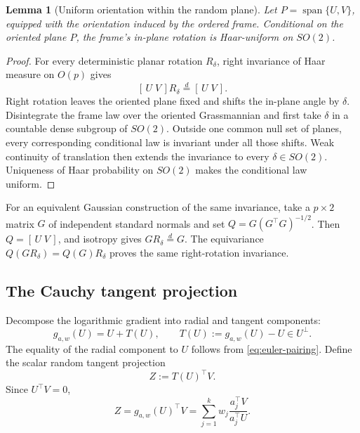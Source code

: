 \documentclass[11pt]{article}
\numberwithin{equation}{section}
\theoremstyle{thmstyleone}%
\newtheorem{lemma}[lemma]{Lemma}
\theoremstyle{thmstyletwo}%
\let\cref\autoref
\begin{document}
\begin{lemma}[Uniform orientation within the random plane]
\label{lem:uniform-frame-phase}
Let \(P=\operatorname{span}\{U,V\}\), equipped with the orientation induced
by the ordered frame.  Conditional on the oriented plane \(P\), the frame's
in-plane rotation is Haar-uniform on \(SO(2)\).
\end{lemma}

\begin{proof}
For every deterministic planar rotation \(R_\delta\), right invariance of
Haar measure on \(O(p)\) gives
\[
 [\,U\;V\,]R_\delta\overset{d}{=}[\,U\;V\,].
\]
Right rotation leaves the oriented plane fixed and shifts the in-plane angle
by \(\delta\).  Disintegrate the frame law over the oriented Grassmannian and
first take \(\delta\) in a countable dense subgroup of \(SO(2)\).  Outside
one common null set of planes, every corresponding conditional law is
invariant under all those shifts.  Weak continuity of translation then
extends the invariance to every \(\delta\in SO(2)\).  Uniqueness of Haar
probability on \(SO(2)\) makes the conditional law uniform.
\end{proof}

For an equivalent Gaussian construction of the same invariance, take a
\(p\times2\) matrix \(G\) of independent standard normals and set
\(Q=G(G^\top G)^{-1/2}\).  Then \(Q=[\,U\;V\,]\), and isotropy gives
\(GR_\delta\overset{d}{=}G\).  The equivariance
\(Q(GR_\delta)=Q(G)R_\delta\) proves the same right-rotation invariance.

\subsection{The Cauchy tangent projection}

Decompose the logarithmic gradient into radial and tangent components:
\begin{equation}
  g_{a,w}(U)=U+T(U),
  \qquad
  T(U):=g_{a,w}(U)-U\in U^\perp.
  \label{eq:tangent-decomposition}
\end{equation}
The equality of the radial component to \(U\) follows from
\cref{eq:euler-pairing}.  Define the scalar random tangent projection
\begin{equation}
  Z:=T(U)^\top V.
  \label{eq:random-projection}
\end{equation}
Since \(U^\top V=0\),
\begin{equation}
  Z
  =g_{a,w}(U)^\top V
  =\sum_{j=1}^k w_j
    \frac{a_j^\top V}{a_j^\top U}.
  \label{eq:Z-ratio-sum}
\end{equation}
\end{document}
